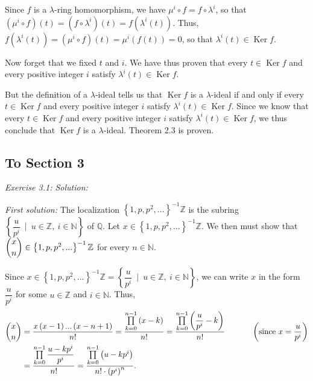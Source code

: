 \documentclass[numbers=enddot,12pt,final,onecolumn,notitlepage]{scrartcl}%
\begin{document}
Since $f$ is a $\lambda$-ring homomorphism, we have $\mu^{i}\circ
f=f\circ\lambda^{i}$, so that $\left(  \mu^{i}\circ f\right)  \left(
t\right)  =\left(  f\circ\lambda^{i}\right)  \left(  t\right)  =f\left(
\lambda^{i}\left(  t\right)  \right)  $. Thus, $f\left(  \lambda^{i}\left(
t\right)  \right)  =\left(  \mu^{i}\circ f\right)  \left(  t\right)  =\mu
^{i}\left(  f\left(  t\right)  \right)  =0$, so that $\lambda^{i}\left(
t\right)  \in\operatorname*{Ker}f$.

Now forget that we fixed $t$ and $i$. We have thus proven that every
$t\in\operatorname*{Ker}f$ and every positive integer $i$ satisfy $\lambda
^{i}\left(  t\right)  \in\operatorname*{Ker}f$.

But the definition of a $\lambda$-ideal tells us that $\operatorname*{Ker}f$
is a $\lambda$-ideal if and only if every $t\in\operatorname*{Ker}f$ and every
positive integer $i$ satisfy $\lambda^{i}\left(  t\right)  \in
\operatorname*{Ker}f$. Since we know that every $t\in\operatorname*{Ker}f$ and
every positive integer $i$ satisfy $\lambda^{i}\left(  t\right)
\in\operatorname*{Ker}f$, we thus conclude that $\operatorname*{Ker}f$ is a
$\lambda$-ideal. Theorem 2.3 is proven.

\subsection{To Section 3}

\textit{Exercise 3.1: Solution:}

\textit{First solution:} The localization $\left\{  1,p,p^{2},...\right\}
^{-1}\mathbb{Z}$ is the subring $\left\{  \dfrac{u}{p^{i}}\ \mid
\ u\in\mathbb{Z},\ i\in\mathbb{N}\right\}  $ of $\mathbb{Q}$. Let
$x\in\left\{  1,p,p^{2},...\right\}  ^{-1}\mathbb{Z}$. We then must show that
$\dbinom{x}{n}\in\left\{  1,p,p^{2},...\right\}  ^{-1}\mathbb{Z}$ for every
$n\in\mathbb{N}$.

Since $x\in\left\{  1,p,p^{2},...\right\}  ^{-1}\mathbb{Z}=\left\{  \dfrac
{u}{p^{i}}\ \mid\ u\in\mathbb{Z},\ i\in\mathbb{N}\right\}  $, we can write $x$
in the form $\dfrac{u}{p^{i}}$ for some $u\in\mathbb{Z}$ and $i\in\mathbb{N}$.
Thus,%
\begin{align*}
\dbinom{x}{n}  &  =\dfrac{x\left(  x-1\right)  ...\left(  x-n+1\right)  }%
{n!}=\dfrac{\prod\limits_{k=0}^{n-1}\left(  x-k\right)  }{n!}=\dfrac
{\prod\limits_{k=0}^{n-1}\left(  \dfrac{u}{p^{i}}-k\right)  }{n!}%
\ \ \ \ \ \ \ \ \ \ \left(  \text{since }x=\dfrac{u}{p^{i}}\right) \\
&  =\dfrac{\prod\limits_{k=0}^{n-1}\dfrac{u-kp^{i}}{p^{i}}}{n!}=\dfrac
{\prod\limits_{k=0}^{n-1}\left(  u-kp^{i}\right)  }{n!\cdot\left(
p^{i}\right)  ^{n}}.
\end{align*}
\end{document}
